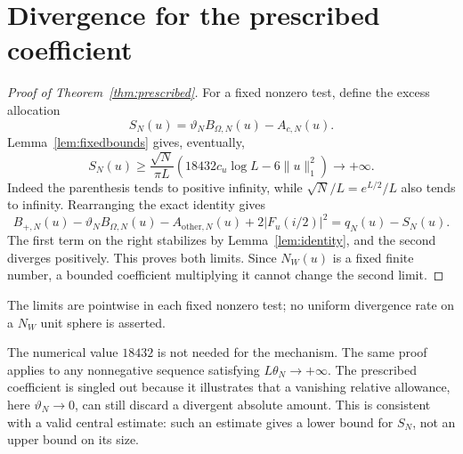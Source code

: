 \documentclass[11pt]{article}
\theoremstyle{remark}
\newcommand{\norm}[1]{\lVert #1\rVert}
\newcommand{\NW}{N_W}
\numberwithin{equation}{section}
\begin{document}
\section{Divergence for the prescribed coefficient}\label{sec:prescribedproof}
\begin{proof}[Proof of Theorem~\ref{thm:prescribed}]
For a fixed nonzero test, define the excess allocation
\begin{equation}\label{eq:slack}
 S_N(u)=\vartheta_NB_{\Omega,N}(u)-A_{c,N}(u).
\end{equation}
Lemma~\ref{lem:fixedbounds} gives, eventually,
\begin{equation}\label{eq:prescribedlower}
 S_N(u)\ge\frac{\sqrt N}{\pi L}
       \left(18432c_u\log L-6\norm{u}_1^2\right)
       \longrightarrow+\infty.
\end{equation}
Indeed the parenthesis tends to positive infinity, while $\sqrt N/L=e^{L/2}/L$ also tends to infinity. Rearranging the exact identity gives
\begin{equation}\label{eq:residualidentity}
 B_{+,N}(u)-\vartheta_NB_{\Omega,N}(u)-A_{\mathrm{other},N}(u)
       +2|F_u(i/2)|^2=q_N(u)-S_N(u).
\end{equation}
The first term on the right stabilizes by Lemma~\ref{lem:identity}, and the second diverges positively. This proves both limits. Since $\NW(u)$ is a fixed finite number, a bounded coefficient multiplying it cannot change the second limit.
\end{proof}

The limits are pointwise in each fixed nonzero test; no uniform divergence rate on a $\NW$ unit sphere is asserted.

The numerical value $18432$ is not needed for the mechanism. The same proof applies to any nonnegative sequence satisfying $L\theta_N\to+\infty$. The prescribed coefficient is singled out because it illustrates that a vanishing relative allowance, here $\vartheta_N\to0$, can still discard a divergent absolute amount. This is consistent with a valid central estimate: such an estimate gives a lower bound for $S_N$, not an upper bound on its size.
\end{document}

